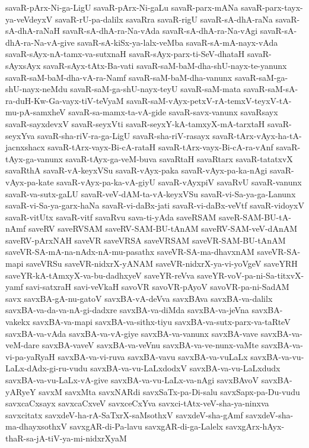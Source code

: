 {savaR-pArx-Ni-ga-LigU
savaR-pArx-Ni-gaLu
savaR-parx-mANa
savaR-parx-tayx-ya-veVdeyxV
savaR-rU-pa-dalilx
savaRra
savaR-rigU
savaR-sA-dhA-raNa
savaR-sA-dhA-raNaH
savaR-sA-dhA-ra-Na-vAda
savaR-sA-dhA-ra-Na-vAgi
savaR-sA-dhA-ra-Na-vA-give
savaR-sA-kiSx-ya-lalx-veMba
savaR-sA-mA-nayx-vAda
savaR-sAyx-nA-tamx-va-sutxnaH
savaR-sAyx-parx-ti-SeV-dhataH
savaR-sAyxsAyx
savaR-sAyx-tAtx-Ba-vati
savaR-saM-baM-dha-shU-nayx-te-yanunx
savaR-saM-baM-dha-vA-ra-Namf
savaR-saM-baM-dha-vanunx
savaR-saM-ga-shU-nayx-neMdu
savaR-saM-ga-shU-nayx-teyU
savaR-saM-mata
savaR-saM-sA-ra-duH-Kw-Ga-vayx-tiV-teVyaM
savaR-saM-vAyx-petxV-rA-temxV-teyxV-tA-mu-pA-samxheV
savaR-sa-mamx-ta-vA-gide
savaR-savx-vanunx
savaRsayx
savaR-sayxdevxV
savaR-seyxVti
savaR-seyxY-kA-tamxyX-mA-tarxtaH
savaR-seyxYva
savaR-sha-riV-ra-ga-LigU
savaR-sha-riV-rasayx
savaR-tArx-vAyx-ha-tA-jacnxshacx
savaR-tArx-vayx-Bi-cA-rataH
savaR-tArx-vayx-Bi-cA-ra-vAnf
savaR-tAyx-ga-vanunx
savaR-tAyx-ga-veM-buva
savaRtaH
savaRtarx
savaR-tatatxvX
savaRthA
savaR-vA-keyxVSu
savaR-vAyx-paka
savaR-vAyx-pa-ka-nAgi
savaR-vAyx-pa-kate
savaR-vAyx-pa-ka-vA-giyU
savaR-vAyxpiV
savaRvU
savaR-vanunx
savaR-va-sutx-gaLU
savaR-veV-dAM-ta-vA-keyxVSu
savaR-vi-Sa-ya-ga-Lanunx
savaR-vi-Sa-ya-garx-haNa
savaR-vi-daBx-jati
savaR-vi-daBx-veVtf
savaR-vidoyxV
savaR-vitUtx
savaR-vitf
savaRvu
sava-ti-yAda
saveRSAM
saveR-SAM-BU-tA-nAmf
saveRV
saveRVSAM
saveRV-SAM-BU-tAnAM
saveRV-SAM-veV-dAnAM
saveRV-pArxNAH
saveVR
saveVRSA
saveVRSAM
saveVR-SAM-BU-tAnAM
saveVR-SA-mA-na-nAdx-nA-mu-pasathx
saveVR-SA-ma-dhavxnAM
saveVR-SA-mapi
saveVRSu
saveVR-nidxrX-yANAM
saveVR-nidxrX-ya-vi-yoVgeV
saveYRH
saveYR-kA-tAmxyX-va-bu-dadhxyeV
saveYR-reVva
saveYR-voV-pa-ni-Sa-titxvX-yamf
savi-satxraH
savi-veVkaH
savoVR
savoVR-pAyoV
savoVR-pa-ni-SadAM
savx
savxBA-gA-nu-gatoV
savxBA-vA-deVva
savxBAva
savxBA-va-dalilx
savxBA-va-da-va-nA-gi-dadxre
savxBA-va-diMda
savxBA-va-jeVna
savxBA-vakekx
savxBA-va-mapi
savxBA-va-sithx-tiyu
savxBA-va-sutx-parx-va-taRteV
savxBA-va-vAda
savxBA-va-vA-giye
savxBA-va-vanunx
savxBA-vave
savxBA-va-veM-dare
savxBA-vaveV
savxBA-va-veVnu
savxBA-va-ve-nunx-vaMte
savxBA-va-vi-pa-yaRyaH
savxBA-va-vi-ruva
savxBA-vavu
savxBA-va-vuLaLx
savxBA-va-vu-LaLx-dAdx-gi-ru-vudu
savxBA-va-vu-LaLxdodxV
savxBA-va-vu-LaLxdudx
savxBA-va-vu-LaLx-vA-give
savxBA-va-vu-LaLx-va-nAgi
savxBAvoV
savxBA-yARyeY
savxM
savxMta
savxNARdi
savxSaTx-pa-Di-salu
savxSapx-pa-Du-vudu
savxcaCxsayx
savxcaCxveV
savxceCxYva
savxci-tAtx-veV-sha-ya-ninxva
savxcitatx
savxdeV-ha-rA-SaTxrX-saMsothxV
savxdeV-sha-gAmf
savxdeV-sha-ma-dhayxsothxV
savxgAR-di-Pa-lavu
savxgAR-di-ga-Lalelx
savxgArx-hAyx-thaR-sa-jA-tiV-ya-mi-nidxrXyaM
}
